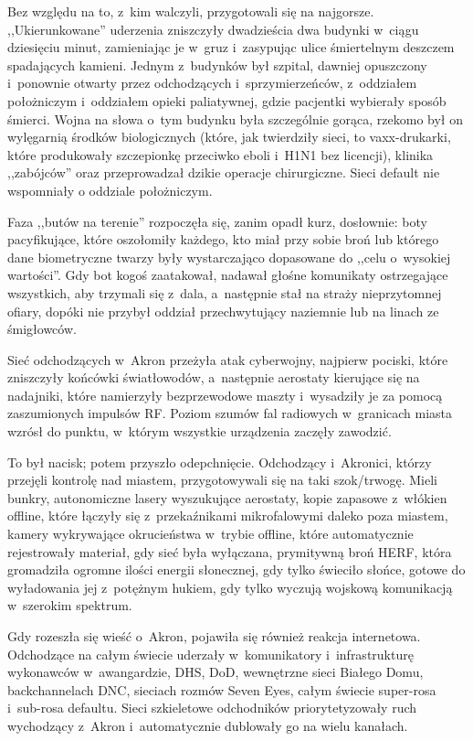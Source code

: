 \documentclass[oneside,polish,11pt,sfheadings]{mwbk}
\begin{document}
Bez względu na to, z~kim walczyli, przygotowali się na najgorsze.
,,Ukierunkowane'' uderzenia zniszczyły dwadzieścia dwa budynki w~ciągu
dziesięciu minut, zamieniając je w~gruz i~zasypując ulice śmiertelnym
deszczem spadających kamieni. Jednym z~budynków był szpital, dawniej
opuszczony i~ponownie otwarty przez odchodzących i~sprzymierzeńców, z~oddziałem położniczym i~oddziałem opieki paliatywnej, gdzie pacjentki
wybierały sposób śmierci. Wojna na słowa o~tym budynku była szczególnie
gorąca, rzekomo był on wylęgarnią środków biologicznych (które, jak
twierdziły sieci, to vaxx-drukarki, które produkowały szczepionkę
przeciwko eboli i~H1N1 bez licencji), klinika ,,zabójców'' oraz
przeprowadzał dzikie operacje chirurgiczne. Sieci default nie wspomniały
o oddziale położniczym.

Faza ,,butów na terenie'' rozpoczęła się, zanim opadł kurz, dosłownie:
boty pacyfikujące, które oszołomiły każdego, kto miał przy sobie broń
lub którego dane biometryczne twarzy były wystarczająco dopasowane do
,,celu o~wysokiej wartości''. Gdy bot kogoś zaatakował, nadawał głośne
komunikaty ostrzegające wszystkich, aby trzymali się z~dala, a~następnie
stał na straży nieprzytomnej ofiary, dopóki nie przybył oddział
przechwytujący naziemnie lub na linach ze śmigłowców.

Sieć odchodzących w~Akron przeżyła atak cyberwojny, najpierw pociski,
które zniszczyły końcówki światłowodów, a~następnie aerostaty kierujące
się na nadajniki, które namierzyły bezprzewodowe maszty i~wysadziły je
za pomocą zaszumionych impulsów RF. Poziom szumów fal radiowych w~granicach miasta wzrósł do punktu, w~którym wszystkie urządzenia zaczęły
zawodzić.

To był nacisk; potem przyszło odepchnięcie. Odchodzący i~Akronici,
którzy przejęli kontrolę nad miastem, przygotowywali się na taki
szok/trwogę. Mieli bunkry, autonomiczne lasery wyszukujące aerostaty,
kopie zapasowe z~włókien offline, które łączyły się z~przekaźnikami
mikrofalowymi daleko poza miastem, kamery wykrywające okrucieństwa w~trybie offline, które automatycznie rejestrowały materiał, gdy sieć była
wyłączana, prymitywną broń HERF, która gromadziła ogromne ilości energii
słonecznej, gdy tylko świeciło słońce, gotowe do wyładowania jej z~potężnym hukiem, gdy tylko wyczują wojskową komunikacją w~szerokim
spektrum.

Gdy rozeszła się wieść o~Akron, pojawiła się również reakcja
internetowa. Odchodzące na całym świecie uderzały w~komunikatory i~infrastrukturę wykonawców w~awangardzie, DHS, DoD, wewnętrzne sieci
Białego Domu, backchannelach DNC, sieciach rozmów Seven Eyes, całym
świecie super-rosa i~sub-rosa defaultu. Sieci szkieletowe odchodników
priorytetyzowały ruch wychodzący z~Akron i~automatycznie dublowały go na
wielu kanałach.
\end{document}
